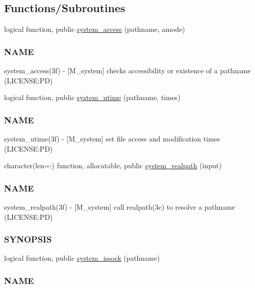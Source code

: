 \subsection*{Functions/\+Subroutines}
\begin{DoxyCompactItemize}
\item 
logical function, public \mbox{\hyperlink{namespacem__system_a4687a363acbb7084a51bc77844789275}{system\+\_\+access}} (pathname, amode)
\begin{DoxyCompactList}\small\item\em \subsubsection*{N\+A\+ME}

system\+\_\+access(3f) -\/ \mbox{[}M\+\_\+system\mbox{]} checks accessibility or existence of a pathname (L\+I\+C\+E\+N\+SE\+:PD) \end{DoxyCompactList}\item 
logical function, public \mbox{\hyperlink{namespacem__system_a83a121ba0b525210b5217565569ef350}{system\+\_\+utime}} (pathname, times)
\begin{DoxyCompactList}\small\item\em \subsubsection*{N\+A\+ME}

system\+\_\+utime(3f) -\/ \mbox{[}M\+\_\+system\mbox{]} set file access and modification times (L\+I\+C\+E\+N\+SE\+:PD) \end{DoxyCompactList}\item 
character(len=\+:) function, allocatable, public \mbox{\hyperlink{namespacem__system_a70bbfa0a0be084b9717cbc04408041fc}{system\+\_\+realpath}} (input)
\begin{DoxyCompactList}\small\item\em \subsubsection*{N\+A\+ME}

system\+\_\+realpath(3f) -\/ \mbox{[}M\+\_\+system\mbox{]} call realpath(3c) to resolve a pathname (L\+I\+C\+E\+N\+SE\+:PD) \subsubsection*{S\+Y\+N\+O\+P\+S\+IS}\end{DoxyCompactList}\item 
logical function, public \mbox{\hyperlink{namespacem__system_af6eb5074fe74552bc7a5e7d00f459087}{system\+\_\+issock}} (pathname)
\begin{DoxyCompactList}\small\item\em \subsubsection*{N\+A\+ME}


\end{DoxyCompactList}
\end{DoxyCompactItemize}
